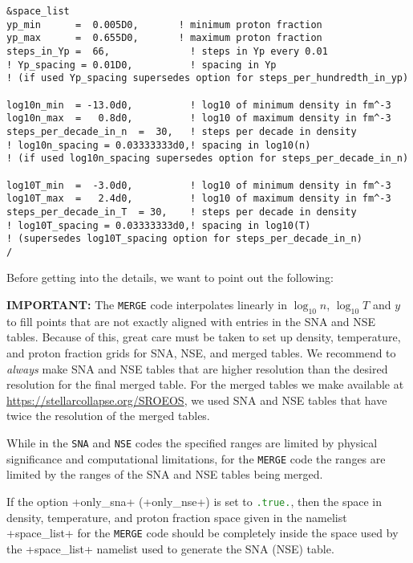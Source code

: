 \documentclass[letterpaper,11pt]{refart}
\begin{document}
{\color{cyan}
\begin{verbatim}
&space_list
yp_min      =  0.005D0,       ! minimum proton fraction
yp_max      =  0.655D0,       ! maximum proton fraction
steps_in_Yp =  66,              ! steps in Yp every 0.01
! Yp_spacing = 0.01D0,          ! spacing in Yp 
! (if used Yp_spacing supersedes option for steps_per_hundredth_in_yp)

log10n_min  = -13.0d0,          ! log10 of minimum density in fm^-3
log10n_max  =   0.8d0,          ! log10 of maximum density in fm^-3
steps_per_decade_in_n  =  30,   ! steps per decade in density
! log10n_spacing = 0.03333333d0,! spacing in log10(n) 
! (if used log10n_spacing supersedes option for steps_per_decade_in_n)

log10T_min  =  -3.0d0,          ! log10 of minimum density in fm^-3
log10T_max  =   2.4d0,          ! log10 of maximum density in fm^-3
steps_per_decade_in_T  = 30,    ! steps per decade in density
! log10T_spacing = 0.03333333d0,! spacing in log10(T) 
! (supersedes log10T_spacing option for steps_per_decade_in_n)
/
\end{verbatim}}

Before getting into the details, we want to point out the following:

\medskip
\begin{framed}\textbf{IMPORTANT:} 
  The \texttt{MERGE} code interpolates linearly in $\log_{10} n$,
  $\log_{10} T$ and $y$ to fill points that are not exactly aligned
  with entries in the SNA and NSE tables. Because of this, great care
  must be taken to set up density, temperature, and proton fraction
  grids for SNA, NSE, and merged tables. We recommend to \emph{always}
  make SNA and NSE tables that are higher resolution than the desired
  resolution for the final merged table. For the merged tables we make
  available at \url{https://stellarcollapse.org/SROEOS}, we used SNA
  and NSE tables that have twice the resolution of the merged tables.
\end{framed}

While in the \verb+SNA+ and \verb+NSE+ codes the specified ranges are
limited by physical significance and computational limitations, for
the \verb+MERGE+ code the ranges are limited by the ranges of the SNA
and NSE tables being merged.

If the option \verbprm+only_sna+ (\verbprm+only_nse+) is set to
\texttt{\textcolor{ForestGreen}{.true.}}, then the space in density,
temperature, and proton fraction space given in the namelist
\verbnml+space_list+ for the \texttt{MERGE} code should be completely inside
the space used by the \verbnml+space_list+ namelist used to generate
the SNA (NSE) table.
\end{document}
